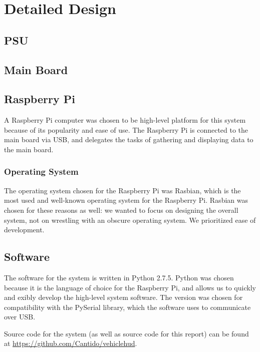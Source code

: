 \section{Detailed Design}

\subsection{PSU}

\subsection{Main Board}

\subsection{Raspberry Pi}

A Raspberry Pi computer was chosen to be high-level platform for this system
because of its popularity and ease of use. The Raspberry Pi is connected to the
main board via USB, and delegates the tasks of gathering and displaying data
to the main board.

\subsubsection{Operating System}
The operating system chosen for the Raspberry Pi was Rasbian, which is the
most used and well-known operating system for the Raspberry Pi. Rasbian was
chosen for these reasons as well: we wanted to focus on designing the overall
system, not on wrestling with an obscure operating system. We prioritized ease
of development.

\subsection{Software}
The software for the system is written in Python 2.7.5. Python was chosen
because it is the language of choice for the Raspberry Pi, and allows us to
quickly and 
exibly develop the high-level system software. The version was
chosen for compatibility with the PySerial library, which the software uses to
communicate over USB.

Source code for the system (as well as source code for this report) can be
found at \url{https://github.com/Cantido/vehiclehud}.
